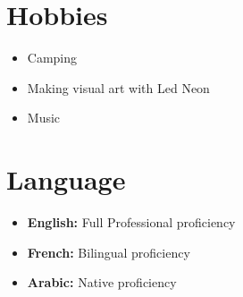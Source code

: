 \documentclass{my_cv}
\begin{document}
\section{Hobbies}
\begin{itemize}[leftmargin=10pt, itemsep=0pt]

\item Camping
\item Making visual art with Led Neon 
\item Music

\end{itemize}

\section{Language}
\begin{itemize}[leftmargin=10pt, itemsep=0pt]

\item {\bf English:} Full Professional proficiency
\item {\bf French:} Bilingual proficiency
\item {\bf Arabic:} Native proficiency

\end{itemize}




\end{document}
